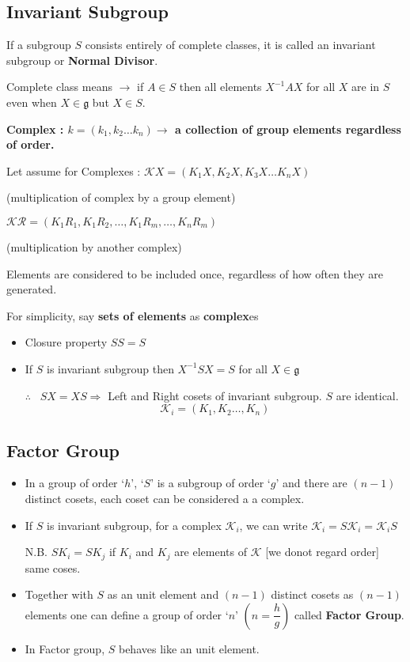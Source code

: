 \subsection*{Invariant Subgroup}

If a subgroup $S$ consists entirely of complete classes, it is called an invariant subgroup or {\bf Normal Divisor}.

Complete class means $\to$ if $A\in S$ then all elements $X^{-1}AX$ for all $X$ are in $S$ even when $X\in \mathfrak{g}$ but $X\in S$.

{\bf Complex : \boldmath$k=(k_{1},k_{2}\ldots k_{n})\to$ a collection of group elements regardless of order.}

Let assume for Complexes : $\mathcal{K}X=(K_{1}X,K_{2}X,K_{3}X\ldots K_{n}X)$

(multiplication of complex by a group element)

$\mathcal{K}\mathcal{R}=(K_{1}R_{1},K_{1}R_{2},\ldots,K_{1}R_{m},\ldots,K_{n}R_{m})$

(multiplication by another complex)

Elements are considered to be included once, regardless of how often they are generated.

For simplicity, say {\bf sets of elements} as {\bf complex}es 
\begin{itemize}
\item Closure property $SS=S$

\item If $S$ is invariant subgroup then $X^{-1}SX=S$ for all $X\in \mathfrak{g}$

$\therefore$ \ $SX=XS\Rightarrow$ Left and Right cosets of invariant subgroup. $S$ are identical.
$$
\mathcal{K}_{i}=(K_{1},K_{2}\ldots, K_{n})
$$
\end{itemize}

\subsection*{Factor Group}
\begin{itemize}
\item In a group of order `$h$', `$S$' is a subgroup of order `$g$' and there are $(n-1)$ distinct cosets, each coset can be considered a a complex.

\item If $S$ is invariant subgroup, for a complex $\mathcal{K}_{i}$, we can write $\mathcal{K}_{i}=S\mathcal{K}_{i}=\mathcal{K}_{i}S$

N.B. $SK_{i}=SK_{j}$ if $K_{i}$ and $K_{j}$ are elements of $\mathcal{K}$ [we donot regard order] same coses.

\item Together with $S$ as an unit element and $(n-1)$ distinct cosets as $(n-1)$ elements one can define a group of order `$n$' $(n=\dfrac{h}{g})$ called {\bf Factor Group}.

\item In Factor group, $S$ behaves like an unit element.
\end{itemize}

